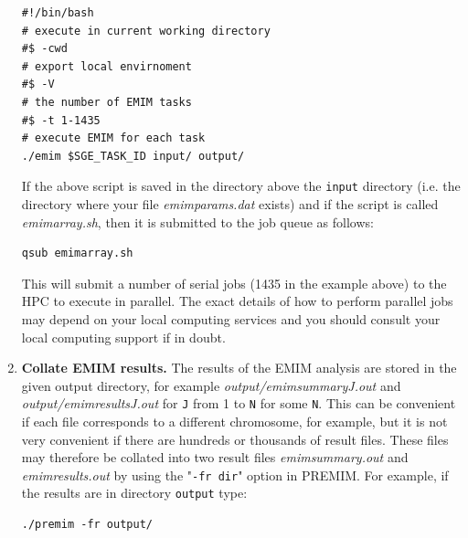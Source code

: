 \documentclass[a4paper,12pt]{article}
\newcommand{\code}[1]{{\footnotesize{{\tt #1}}}}
\begin{document}
\begin{enumerate}
\begin{lstlisting}
#!/bin/bash
# execute in current working directory
#$ -cwd
# export local envirnoment
#$ -V
# the number of EMIM tasks 
#$ -t 1-1435
# execute EMIM for each task
./emim $SGE_TASK_ID input/ output/

\end{lstlisting} \vspace{0.35cm}If the above script is saved in the directory above the \code{input} directory (i.e. the directory where your file {\it emimparams.dat} exists) and if the script is called {\it emimarray.sh}, then it is submitted to the job queue as follows: \vspace{0.35cm} \begin{lstlisting}
qsub emimarray.sh 
\end{lstlisting} \vspace{0.35cm}This will submit a number of serial jobs (1435 in the example above) to the HPC to execute in parallel. The exact details of how to perform parallel jobs may depend on your local computing services and you should consult your local computing support if in doubt. 
\item {\bf Collate EMIM results.} The results of the EMIM analysis are stored in the given output directory, for example {\it output/emimsummaryJ.out} and {\it output/emimresultsJ.out} for \code{J} from 1 to \code{N} for some \code{N}. This can be convenient if each file corresponds to a different chromosome, for example, but it is not very convenient if there are hundreds or thousands of result files. These files may therefore be collated into two result files {\it emimsummary.out} and {\it emimresults.out} by using the "\code{-fr dir}" option in PREMIM. For example, if the results are in directory \code{output} type: \vspace{0.35cm} \begin{lstlisting}
./premim -fr output/ 

\end{lstlisting}
\end{enumerate}
\end{document}
